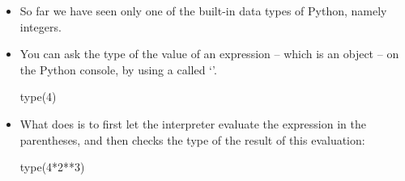 \documentclass[a4paper]{article}
\begin{document}
\begin{itemize}
\item So far we have seen only one of the built-in data types of Python, namely
integers.

\item You can ask the type of the value of an expression -- which is an object
-- on the Python console, by using a  called `'. 

\begin{ucodeframe}
\begin{pyconsole}
type(4)
\end{pyconsole}
\end{ucodeframe}

\item What  does is to first let the interpreter evaluate the
expression in the parentheses, and then checks the type of the result of this
evaluation:

\begin{ucodeframe}
\begin{pyconsole}
type(4*2**3)
\end{pyconsole}
\end{ucodeframe}

\end{itemize}
\end{document}
